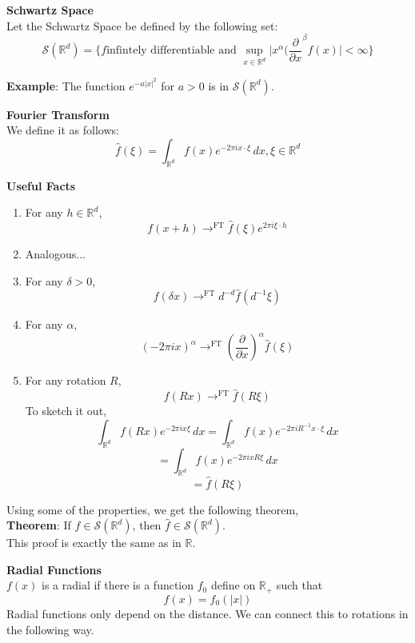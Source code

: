 \documentclass[12pt]{article}
\begin{document}
\noindent \textbf{Schwartz Space} \\
\noindent Let the Schwartz Space be defined by the following set: 
$$\mathcal{S}(\mathbb{R}^d) = \{f \text{infintely differentiable and } \sup_{x\in\mathbb{R}^d} \vert x^\alpha (\frac{\partial}{\partial x}^\beta f(x)\vert < \infty\}$$

\noindent \textbf{Example}: The function $e^{-a\vert x\vert^2}$ for $a >0$ is in $\mathcal{S}(\mathbb{R}^d)$. 

\noindent \textbf{Fourier Transform} \\
\noindent We define it as follows:
$$\hat{f}(\xi) = \int_{\mathbb{R}^d} f(x) e^{-2\pi i x\cdot \xi} \, dx, \xi \in \mathbb{R}^d$$

\textbf{Useful Facts} \\
\begin{enumerate}
\item For any $h \in \mathbb{R}^d$, 
$$f(x+h) \rightarrow^{\text{FT}} \hat{f}(\xi) e^{2\pi i \xi \cdot h}$$
\item Analogous...
\item For any $\delta > 0$,
$$f(\delta x)  \rightarrow^{\text{FT}} d^{-d} \hat{f}(d^{-1}\xi)$$
\item For any $\alpha$, 
$$(-2\pi i x)^\alpha  \rightarrow^{\text{FT}} (\frac{\partial}{\partial x})^\alpha \hat{f}(\xi)$$
\item For any rotation $R$, 
$$f(Rx)  \rightarrow^{\text{FT}} \hat{f}(R\xi)$$
To sketch it out,
$$\int_{\mathbb{R}^d} f(Rx)e^{-2\pi i x \xi} \,dx = \int_{\mathbb{R}^d} f(x) e^{-2\pi i R^{-1} x \cdot \xi} \,dx$$
$$ = \int_{\mathbb{R}^d} f(x) e^{-2\pi i  xR\xi} \,dx$$
$$ = \hat{f}(R \xi)$$
\end{enumerate}
\noindent Using some of the properties, we get the following theorem, \\

\noindent \textbf{Theorem}: If $f \in \mathcal{S}(\mathbb{R}^d)$, then $\hat{f} \in \mathcal{S}(\mathbb{R}^d)$. \\

\noindent This proof is exactly the same as in $\mathbb{R}$. 

\noindent \textbf{Radial Functions} \\
\noindent $f(x)$ is a radial if there is a function $f_0$ define on $\mathbb{R}_+$ such that 
$$f(x) = f_0(\vert x \vert)$$
\noindent Radial functions only depend on the distance. We can connect this to rotations in the following way. \\
\end{document}
